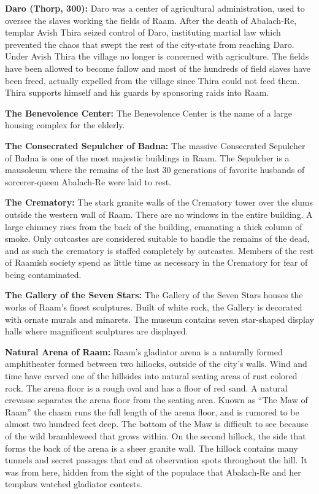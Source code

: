 {
	\textbf{Daro (Thorp, 300):} Daro was a center of agricultural administration, used to oversee the slaves working the fields of Raam. After the death of Abalach-Re, templar Avish Thira seized control of Daro, instituting martial law which prevented the chaos that swept the rest of the city-state from reaching Daro. Under Avish Thira the village no longer is concerned with agriculture. The fields have been allowed to become fallow and most of the hundreds of field slaves have been freed, actually expelled from the village since Thira could not feed them. Thira supports himself and his guards by sponsoring raids into Raam.
}
{
	\textbf{The Benevolence Center:} The Benevolence Center is the name of a large housing complex for the elderly.

	\textbf{The Consecrated Sepulcher of Badna:} The massive Consecrated Sepulcher of Badna is one of the most majestic buildings in Raam. The Sepulcher is a mausoleum where the remains of the last 30 generations of favorite husbands of sorcerer-queen Abalach-Re were laid to rest.

	\textbf{The Crematory:} The stark granite walls of the Crematory tower over the slums outside the western wall of Raam. There are no windows in the entire building. A large chimney rises from the back of the building, emanating a thick column of smoke. Only outcastes are considered suitable to handle the remains of the dead, and as such the crematory is staffed completely by outcastes. Members of the rest of Raamish society spend as little time as necessary in the Crematory for fear of being contaminated.

	\textbf{The Gallery of the Seven Stars:} The Gallery of the Seven Stars houses the works of Raam's finest sculptures. Built of white rock, the Gallery is decorated with ornate murals and minarets. The museum contains seven star-shaped display halls where magnificent sculptures are displayed.

	\textbf{Natural Arena of Raam:} Raam's gladiator arena is a naturally formed amphitheater formed between two hillocks, outside of the city's walls. Wind and time have carved one of the hillsides into natural seating areas of rust colored rock. The arena floor is a rough oval and has a floor of red sand. A natural crevasse separates the arena floor from the seating area. Known as ``The Maw of Raam'' the chasm runs the full length of the arena floor, and is rumored to be almost two hundred feet deep. The bottom of the Maw is difficult to see because of the wild brambleweed that grows within. On the second hillock, the side that forms the back of the arena is a sheer granite wall. The hillock contains many tunnels and secret passages that end at observation spots throughout the hill. It was from here, hidden from the sight of the populace that Abalach-Re and her templars watched gladiator contests.

}
